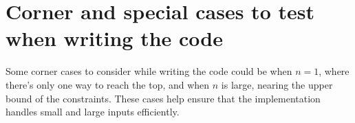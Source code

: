 \section*{Corner and special cases to test when writing the code}
Some corner cases to consider while writing the code could be when \(n = 1\), where there's only one way to reach the top, and when \(n\) is large, nearing the upper bound of the constraints. These cases help ensure that the implementation handles small and large inputs efficiently.